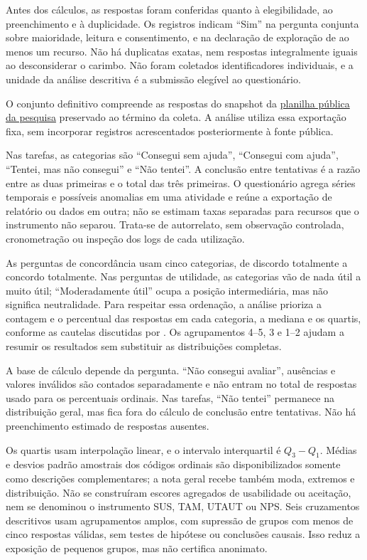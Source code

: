 Antes dos cálculos, as respostas foram conferidas quanto à elegibilidade, ao preenchimento e à duplicidade. Os \UsuariosN{} registros indicam ``Sim'' na pergunta conjunta sobre maioridade, leitura e consentimento, e na declaração de exploração de ao menos um recurso. Não há duplicatas exatas, nem respostas integralmente iguais ao desconsiderar o carimbo. Não foram coletados identificadores individuais, e a unidade da análise descritiva é a submissão elegível ao questionário.

O conjunto definitivo compreende as \UsuariosN{} respostas do snapshot da \href{https://docs.google.com/spreadsheets/d/1wQJfoqnhpUMK8nJkZCLo9wp2YA34BsBons0T_NRZNFw/edit?usp=sharing}{planilha pública da pesquisa} preservado ao término da coleta. A análise utiliza essa exportação fixa, sem incorporar registros acrescentados posteriormente à fonte pública.

Nas tarefas, as categorias são ``Consegui sem ajuda'', ``Consegui com ajuda'', ``Tentei, mas não consegui'' e ``Não tentei''. A conclusão entre tentativas é a razão entre as duas primeiras e o total das três primeiras. O questionário agrega séries temporais e possíveis anomalias em uma atividade e reúne a exportação de relatório ou dados em outra; não se estimam taxas separadas para recursos que o instrumento não separou. Trata-se de autorrelato, sem observação controlada, cronometração ou inspeção dos logs de cada utilização.

As perguntas de concordância usam cinco categorias, de discordo totalmente a concordo totalmente. Nas perguntas de utilidade, as categorias vão de nada útil a muito útil; ``Moderadamente útil'' ocupa a posição intermediária, mas não significa neutralidade. Para respeitar essa ordenação, a análise prioriza a contagem e o percentual das respostas em cada categoria, a mediana e os quartis, conforme as cautelas discutidas por \citet{SULLIVAN2013}. Os agrupamentos 4--5, 3 e 1--2 ajudam a resumir os resultados sem substituir as distribuições completas.

A base de cálculo depende da pergunta. ``Não consegui avaliar'', ausências e valores inválidos são contados separadamente e não entram no total de respostas usado para os percentuais ordinais. Nas tarefas, ``Não tentei'' permanece na distribuição geral, mas fica fora do cálculo de conclusão entre tentativas. Não há preenchimento estimado de respostas ausentes.

Os quartis usam interpolação linear, e o intervalo interquartil é $Q_3-Q_1$. Médias e desvios padrão amostrais dos códigos ordinais são disponibilizados somente como descrições complementares; a nota geral recebe também moda, extremos e distribuição. Não se construíram escores agregados de usabilidade ou aceitação, nem se denominou o instrumento SUS, TAM, UTAUT ou NPS. Seis cruzamentos descritivos usam agrupamentos amplos, com supressão de grupos com menos de cinco respostas válidas, sem testes de hipótese ou conclusões causais. Isso reduz a exposição de pequenos grupos, mas não certifica anonimato.

